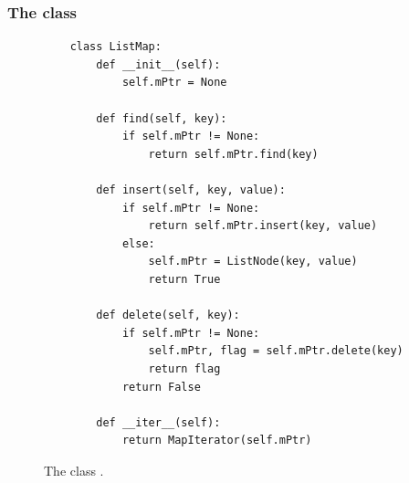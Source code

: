 \subsubsection{The class }
\begin{figure}[!ht]
\centering
\begin{verbatim}
    class ListMap:
        def __init__(self):
            self.mPtr = None
            
        def find(self, key):
            if self.mPtr != None:
                return self.mPtr.find(key)
            
        def insert(self, key, value):
            if self.mPtr != None:
                return self.mPtr.insert(key, value)
            else:
                self.mPtr = ListNode(key, value)
                return True
                
        def delete(self, key):
            if self.mPtr != None:
                self.mPtr, flag = self.mPtr.delete(key)
                return flag
            return False
                
        def __iter__(self):
            return MapIterator(self.mPtr)
\end{verbatim}
\vspace*{-0.3cm}
\caption{The class .}
\label{fig:ListMap.ipynb}
\end{figure}


